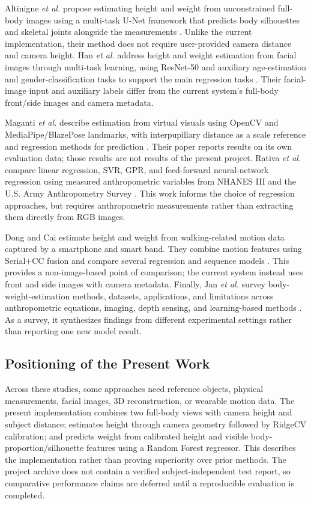 \documentclass[conference]{IEEEtran}
\begin{document}
Altinigne \textit{et al.} propose estimating height and weight from unconstrained full-body images using a multi-task U-Net framework that predicts body silhouettes and skeletal joints alongside the measurements \cite{altinigne2020}. Unlike the current implementation, their method does not require user-provided camera distance and camera height. Han \textit{et al.} address height and weight estimation from facial images through multi-task learning, using ResNet-50 and auxiliary age-estimation and gender-classification tasks to support the main regression tasks \cite{han2020}. Their facial-image input and auxiliary labels differ from the current system's full-body front/side images and camera metadata.

Maganti \textit{et al.} describe estimation from virtual visuals using OpenCV and MediaPipe/BlazePose landmarks, with interpupillary distance as a scale reference and regression methods for prediction \cite{maganti2022}. Their paper reports results on its own evaluation data; those results are not results of the present project. Rativa \textit{et al.} compare linear regression, SVR, GPR, and feed-forward neural-network regression using measured anthropometric variables from NHANES III and the U.S. Army Anthropometry Survey \cite{rativa2018}. This work informs the choice of regression approaches, but requires anthropometric measurements rather than extracting them directly from RGB images.

Dong and Cai estimate height and weight from walking-related motion data captured by a smartphone and smart band. They combine motion features using Serial+CC fusion and compare several regression and sequence models \cite{dong2025}. This provides a non-image-based point of comparison; the current system instead uses front and side images with camera metadata. Finally, Jan \textit{et al.} survey body-weight-estimation methods, datasets, applications, and limitations across anthropometric equations, imaging, depth sensing, and learning-based methods \cite{jan2025}. As a survey, it synthesizes findings from different experimental settings rather than reporting one new model result.

\subsection{Positioning of the Present Work}
Across these studies, some approaches need reference objects, physical measurements, facial images, 3D reconstruction, or wearable motion data. The present implementation combines two full-body views with camera height and subject distance; estimates height through camera geometry followed by RidgeCV calibration; and predicts weight from calibrated height and visible body-proportion/silhouette features using a Random Forest regressor. This describes the implementation rather than proving superiority over prior methods. The project archive does not contain a verified subject-independent test report, so comparative performance claims are deferred until a reproducible evaluation is completed.
\end{document}
